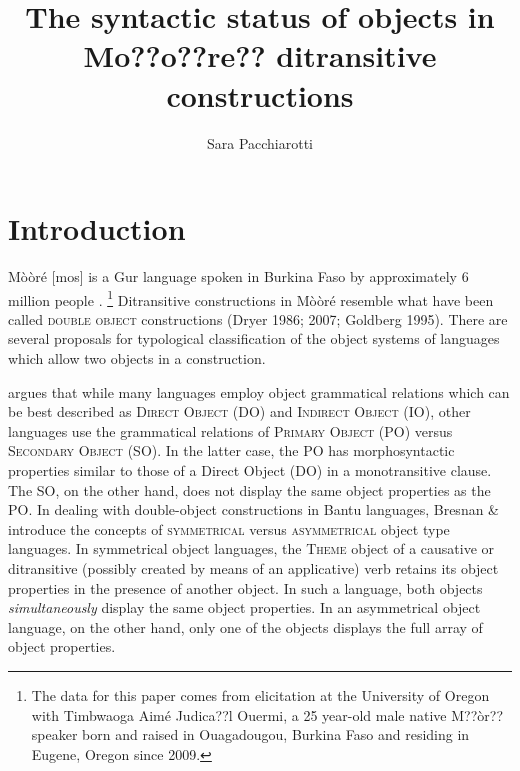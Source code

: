 \documentclass[output=paper]{langsci/langscibook}
\title{The syntactic status of objects in {Mo??o??re??} ditransitive constructions}
\author{%
 Sara Pacchiarotti\affiliation{University of Oregon}
}
\begin{document}


\section{Introduction}

Mòòré [mos] is a Gur language spoken in Burkina Faso by approximately 6 million people \citep{LewisEtAl2016}.{ }\footnote{ The data for this paper comes from elicitation at the University of Oregon with Timbwaoga Aimé Judica??l Ouermi, a 25 year-old male native M??òr?? speaker born and raised in Ouagadougou, Burkina Faso and residing in Eugene, Oregon since 2009.}\textsuperscript{ } Ditransitive constructions in Mòòré resemble what have been called \textsc{double object} constructions (Dryer 1986; 2007; Goldberg 1995). There are several proposals for typological classification of the object systems of languages which allow two objects in a construction.

\citet{Dryer1986} argues that while many languages employ object grammatical relations which can be best described as \textsc{Direct Object} (DO) and \textsc{Indirect Object }(IO), other languages use the grammatical relations of \textsc{Primary Object} (PO) versus \textsc{Secondary Object} (SO). In the latter case, the PO has morphosyntactic properties similar to those of a Direct Object (DO) in a monotransitive clause. The SO, on the other hand, does not display the same object properties as the PO. In dealing with double-object constructions in Bantu languages, Bresnan \& \citet{Moshi1990} introduce the concepts of \textsc{symmetrical} versus \textsc{asymmetrical} object type languages. In symmetrical object languages, the \textsc{Theme} object of a causative or ditransitive (possibly created by means of an applicative) verb retains its object properties in the presence of another object. In such a language, both objects \textit{simultaneously }display the same object properties. In an asymmetrical object language, on the other hand, only one of the objects displays the full array of object properties. 
\end{document}

